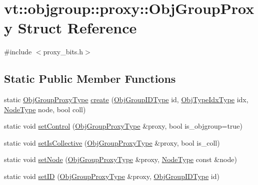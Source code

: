 \hypertarget{structvt_1_1objgroup_1_1proxy_1_1_obj_group_proxy}{}\section{vt\+:\+:objgroup\+:\+:proxy\+:\+:Obj\+Group\+Proxy Struct Reference}
\label{structvt_1_1objgroup_1_1proxy_1_1_obj_group_proxy}


{\ttfamily \#include $<$proxy\+\_\+bits.\+h$>$}

\subsection*{Static Public Member Functions}
\begin{DoxyCompactItemize}
\item 
static \hyperlink{namespacevt_ad7cae989df485fccca57f0792a880a8e}{Obj\+Group\+Proxy\+Type} \hyperlink{structvt_1_1objgroup_1_1proxy_1_1_obj_group_proxy_a0f29068c61712b0c2f9a78000f63cff9}{create} (\hyperlink{namespacevt_1_1objgroup_a54a50ff6833bf618e5bedb9a3b6d0e07}{Obj\+Group\+I\+D\+Type} id, \hyperlink{namespacevt_1_1objgroup_a378e4b966221779c74f3a2f921eb2421}{Obj\+Type\+Idx\+Type} idx, \hyperlink{namespacevt_a866da9d0efc19c0a1ce79e9e492f47e2}{Node\+Type} node, bool coll)
\item 
static void \hyperlink{structvt_1_1objgroup_1_1proxy_1_1_obj_group_proxy_ad80d3bcbde0bad7a7dc0c9082c584e18}{set\+Control} (\hyperlink{namespacevt_ad7cae989df485fccca57f0792a880a8e}{Obj\+Group\+Proxy\+Type} \&proxy, bool is\+\_\+objgroup=true)
\item 
static void \hyperlink{structvt_1_1objgroup_1_1proxy_1_1_obj_group_proxy_a5a4ff4e167d511dd0265bc4370d2389c}{set\+Is\+Collective} (\hyperlink{namespacevt_ad7cae989df485fccca57f0792a880a8e}{Obj\+Group\+Proxy\+Type} \&proxy, bool is\+\_\+coll)
\item 
static void \hyperlink{structvt_1_1objgroup_1_1proxy_1_1_obj_group_proxy_a8df9357e3939df4abbd816b94b3fef32}{set\+Node} (\hyperlink{namespacevt_ad7cae989df485fccca57f0792a880a8e}{Obj\+Group\+Proxy\+Type} \&proxy, \hyperlink{namespacevt_a866da9d0efc19c0a1ce79e9e492f47e2}{Node\+Type} const \&node)
\item 
static void \hyperlink{structvt_1_1objgroup_1_1proxy_1_1_obj_group_proxy_aa05508d3db9a5d82267f5b3b60baa7a2}{set\+ID} (\hyperlink{namespacevt_ad7cae989df485fccca57f0792a880a8e}{Obj\+Group\+Proxy\+Type} \&proxy, \hyperlink{namespacevt_1_1objgroup_a54a50ff6833bf618e5bedb9a3b6d0e07}{Obj\+Group\+I\+D\+Type} id)

\end{DoxyCompactItemize}
